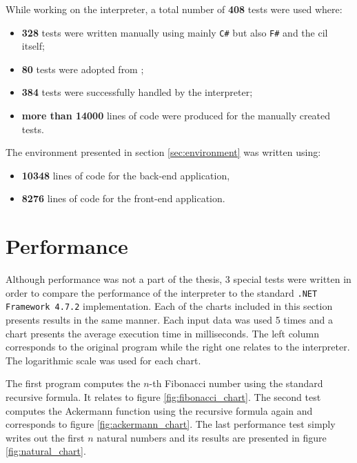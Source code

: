 \documentclass[declaration,shortabstract,english,mgr]{iithesis}
\begin{document}
While working on the interpreter, a total number of \textbf{408} tests were used where:
\begin{itemize}
	\item{\textbf{328} tests were written manually using mainly \texttt{C\#} but also \texttt{F\#} and the \acrshort{cil} itself;}
	\item{\textbf{80} tests were adopted from \cite{tutorialspoint};}
	\item{\textbf{384} tests were successfully handled by the interpreter;}
	\item{\textbf{more than 14000} lines of code were produced for the manually created tests.}
\end{itemize}

The environment presented in section \ref{sec:environment} was written using:
\begin{itemize}
	\item{\textbf{10348} lines of code for the back-end application,}
	\item{\textbf{8276} lines of code for the front-end application.}
\end{itemize}

\section{Performance}
\label{sec:performance}

Although performance was not a part of the thesis, 3 special tests were written in order to compare the performance of the interpreter to the standard \texttt{.NET Framework 4.7.2} implementation. Each of the charts included in this section presents results in the same manner. Each input data was used 5 times and a chart presents the average execution time in milliseconds. The left column corresponds to the original program while the right one relates to the interpreter. The logarithmic scale was used for each chart.

The first program computes the $n$-th Fibonacci number using the standard recursive formula. It relates to figure \ref{fig:fibonacci_chart}. The second test computes the Ackermann function using the recursive formula again and corresponds to figure \ref{fig:ackermann_chart}. The last performance test simply writes out the first $n$ natural numbers and its results are presented in figure \ref{fig:natural_chart}.
\end{document}
